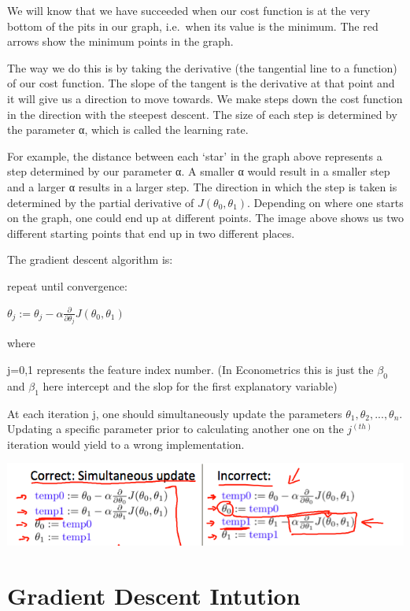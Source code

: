 \documentclass[
]{book}
\begin{document}
We will know that we have succeeded when our cost function is at the very bottom of the pits in our graph, i.e.~when its value is the minimum. The red arrows show the minimum points in the graph.

The way we do this is by taking the derivative (the tangential line to a function) of our cost function. The slope of the tangent is the derivative at that point and it will give us a direction to move towards. We make steps down the cost function in the direction with the steepest descent. The size of each step is determined by the parameter α, which is called the learning rate.

For example, the distance between each `star' in the graph above represents a step determined by our parameter α. A smaller α would result in a smaller step and a larger α results in a larger step. The direction in which the step is taken is determined by the partial derivative of \(J(\theta_0,\theta_1)\). Depending on where one starts on the graph, one could end up at different points. The image above shows us two different starting points that end up in two different places.

The gradient descent algorithm is:

repeat until convergence:

\(\theta_j := \theta_j - \alpha \frac{\partial}{\partial \theta_j} J(\theta_0, \theta_1)\)

where

j=0,1 represents the feature index number. (In Econometrics this is just the \(\beta_0\) and \(\beta_1\) here intercept and the slop for the first explanatory variable)

At each iteration j, one should simultaneously update the parameters \(\theta_1, \theta_2,...,\theta_n\). Updating a specific parameter prior to calculating another one on the \(j^{(th)}\) iteration would yield to a wrong implementation.

\includegraphics{Gradient_descent_graph_2.png}

\hypertarget{gradient-descent-intution}{%
\section{Gradient Descent Intution}\label{gradient-descent-intution}}
\end{document}
